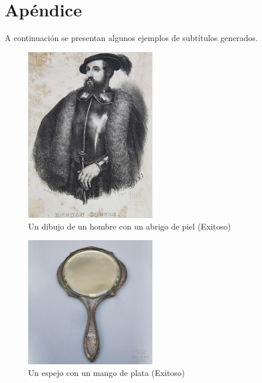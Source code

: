\chapter{Apéndice}\label{chapter:apendice}

A continuación se presentan algunos ejemplos de subtítulos generados.

\begin{figure}[h!]
    \centering
    \includegraphics[width=0.5\textwidth]{Graphics/un dibujo de un hombre con un abrigo de piel.jpg}
    \caption{Un dibujo de un hombre con un abrigo de piel (Exitoso)}
\end{figure} 
\begin{figure}[h!]
    \centering
    \includegraphics[width=0.5\textwidth]{Graphics/un espejo con un mango de plata.jpg}
    \caption{Un espejo con un mango de plata (Exitoso)}
\end{figure}
